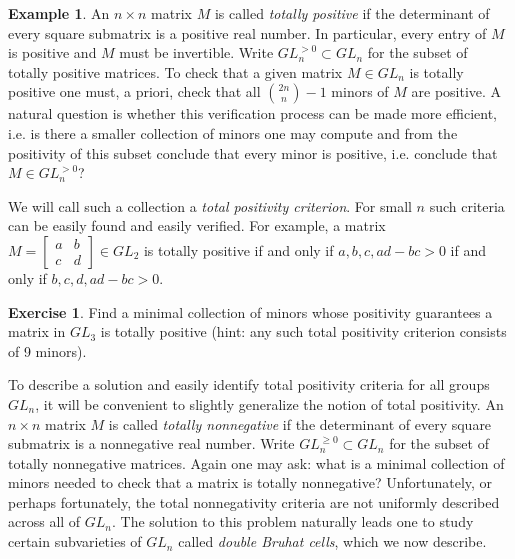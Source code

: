 \documentclass{amsart}
\theoremstyle{definition}
\newtheorem{example}[theorem]{Example}
\newtheorem{exercise}[theorem]{Exercise}
\theoremstyle{remark}
\numberwithin{equation}{section}
\begin{document}
  \begin{example}\label{example:total positivity}
    An $n\times n$ matrix $M$ is called \emph{totally positive} if the determinant of every square submatrix is a positive real number.  In particular, every entry of $M$ is positive and $M$ must be invertible.  Write $GL_n^{>0}\subset GL_n$ for the subset of totally positive matrices.  To check that a given matrix $M\in GL_n$ is totally positive one must, a priori, check that all ${2n\choose n}-1$ minors of $M$ are positive.  A natural question is whether this verification process can be made more efficient, i.e. is there a smaller collection of minors one may compute and from the positivity of this subset conclude that every minor is positive, i.e. conclude that $M\in GL_n^{>0}$?

    We will call such a collection a \emph{total positivity criterion}.  For small $n$ such criteria can be easily found and easily verified.  For example, a matrix $M=\left[\begin{array}{cc} a & b\\ c & d\end{array}\right]\in GL_2$ is totally positive if and only if $a,b,c,ad-bc>0$ if and only if $b,c,d,ad-bc>0$.
    \begin{exercise}
      Find a minimal collection of minors whose positivity guarantees a matrix in $GL_3$ is totally positive (hint: any such total positivity criterion consists of 9 minors).
    \end{exercise}

    To describe a solution and easily identify total positivity criteria for all groups $GL_n$, it will be convenient to slightly generalize the notion of total positivity.  An $n\times n$ matrix $M$ is called \emph{totally nonnegative} if the determinant of every square submatrix is a nonnegative real number.  Write $GL_n^{\ge0}\subset GL_n$ for the subset of totally nonnegative matrices.  Again one may ask: what is a minimal collection of minors needed to check that a matrix is totally nonnegative?  Unfortunately, or perhaps fortunately, the total nonnegativity criteria are not uniformly described across all of $GL_n$.  The solution to this problem naturally leads one to study certain subvarieties of $GL_n$ called \emph{double Bruhat cells}, which we now describe.


\end{example}
\end{document}
